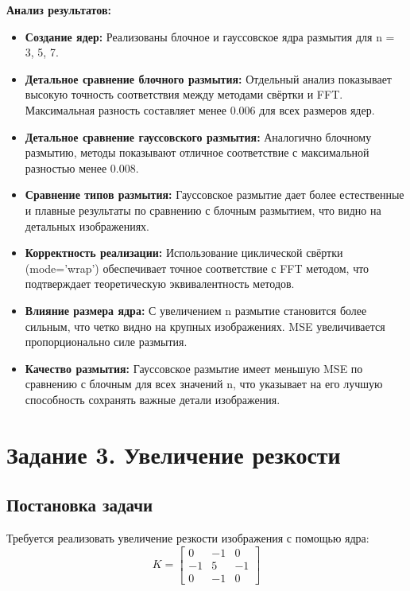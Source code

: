 \textbf{Анализ результатов:}
\begin{itemize}
    \item \textbf{Создание ядер:} Реализованы блочное и гауссовское ядра размытия для n = 3, 5, 7.
    
    \item \textbf{Детальное сравнение блочного размытия:} Отдельный анализ показывает высокую точность соответствия между методами свёртки и FFT. Максимальная разность составляет менее 0.006 для всех размеров ядер.
    
    \item \textbf{Детальное сравнение гауссовского размытия:} Аналогично блочному размытию, методы показывают отличное соответствие с максимальной разностью менее 0.008.
    
    \item \textbf{Сравнение типов размытия:} Гауссовское размытие дает более естественные и плавные результаты по сравнению с блочным размытием, что видно на детальных изображениях.
    
    \item \textbf{Корректность реализации:} Использование циклической свёртки (mode='wrap') обеспечивает точное соответствие с FFT методом, что подтверждает теоретическую эквивалентность методов.
    
    \item \textbf{Влияние размера ядра:} С увеличением n размытие становится более сильным, что четко видно на крупных изображениях. MSE увеличивается пропорционально силе размытия.
    
    \item \textbf{Качество размытия:} Гауссовское размытие имеет меньшую MSE по сравнению с блочным для всех значений n, что указывает на его лучшую способность сохранять важные детали изображения.
\end{itemize}

\section*{Задание 3. Увеличение резкости}

\subsection*{Постановка задачи}

Требуется реализовать увеличение резкости изображения с помощью ядра:
\begin{equation}
K = \begin{bmatrix}
0 & -1 & 0 \\
-1 & 5 & -1 \\
0 & -1 & 0
\end{bmatrix}
\end{equation}

